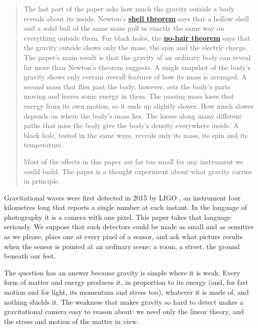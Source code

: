 \begin{quote}
The last part of the paper asks how much the gravity outside a body reveals
about its inside. Newton's
\textbf{\href{https://en.wikipedia.org/wiki/Shell_theorem}{shell theorem}} says
that a hollow shell and a solid ball of the same mass pull in exactly the same
way on everything outside them. For black holes, the
\textbf{\href{https://en.wikipedia.org/wiki/No-hair_theorem}{no-hair theorem}}
says that the gravity outside shows only the mass, the spin and the electric
charge. The paper's main result is that the gravity of an ordinary body can
reveal far more than Newton's theorem suggests. A single snapshot of the body's
gravity shows only certain overall features of how its mass is arranged. A
second mass that flies past the body, however, sets the body's parts moving and
leaves some energy in them. The passing mass loses that energy from its own
motion, so it ends up slightly slower. How much slower depends on where the
body's mass lies. The losses along many different paths that miss the body give
the body's density everywhere inside. A black hole, tested in the same ways,
reveals only its mass, its spin and its temperature.

Most of the effects in this paper are far too small for any instrument we could
build. The paper is a thought experiment about what gravity carries in
principle.
\end{quote}

Gravitational waves were first detected in 2015 by LIGO \cite{LIGO2016}, an instrument four
kilometres long that reports a single number at each instant. In the language
of photography it is a camera with one pixel. This paper takes that language
seriously. We suppose that such detectors could be made as small and as
sensitive as we please, place one at every pixel of a sensor, and ask what
picture results when the sensor is pointed at an ordinary scene: a room, a
street, the ground beneath our feet.

The question has an answer because gravity is simple where it is weak. Every
form of matter and energy produces it, in proportion to its energy (and, for
fast motion and for light, its momentum and stress too), whatever it is made
of, and nothing shields it. The weakness that makes gravity so hard to detect makes a
gravitational camera easy to reason about: we need only the linear theory, and
the stress and motion of the matter in view.

